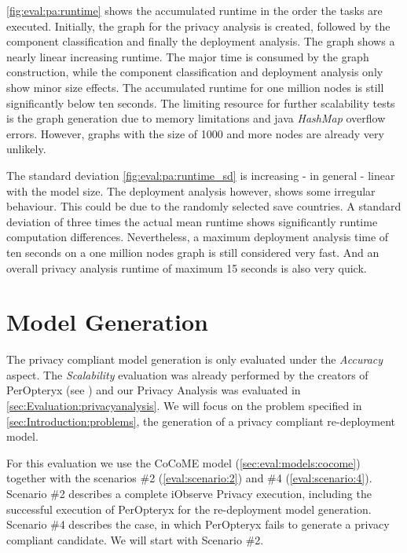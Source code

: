 \autoref{fig:eval:pa:runtime} shows the accumulated runtime in the order the tasks are executed. Initially, the graph for the privacy analysis is created, followed by the component classification and finally the deployment analysis. The graph shows a nearly linear increasing runtime. The major time is consumed by the graph construction, while the component classification and deployment analysis only show minor size effects. The accumulated runtime for one million nodes is still significantly below ten seconds. The limiting resource for further scalability tests is the graph generation due to memory limitations and java \textit{HashMap} overflow errors. However, graphs with the size of 1000 and more nodes are already very unlikely.

The standard deviation \autoref{fig:eval:pa:runtime_sd} is increasing - in general - linear with the model size. The deployment analysis however, shows some irregular behaviour. This could be due to the randomly selected save countries. A standard deviation of three times the actual mean runtime shows significantly runtime computation differences. Nevertheless, a maximum deployment analysis time of ten seconds on a one million nodes graph is still considered very fast. And an overall privacy analysis runtime of maximum 15 seconds is also very quick.


\section{Model Generation}
\label{sec:Evaluation:generation}

The privacy compliant model generation is only evaluated under the \textit{Accuracy} aspect. The \textit{Scalability} evaluation was already performed by the creators of PerOpteryx (see \cite{Koziolek.2014}) and our Privacy Analysis was evaluated in \autoref{sec:Evaluation:privacyanalysis}. We will focus on the problem specified in \autoref{sec:Introduction:problems}, the generation of a privacy compliant re-deployment model.

For this evaluation we use the CoCoME model (\autoref{sec:eval:models:cocome}) together with the scenarios \#2 (\autoref{eval:scenario:2}) and \#4 (\autoref{eval:scenario:4}). Scenario \#2 describes a complete iObserve Privacy execution, including the successful execution of PerOpteryx for the re-deployment model generation. Scenario \#4 describes the case, in which PerOpteryx fails to generate a privacy compliant candidate. We will start with Scenario \#2.

